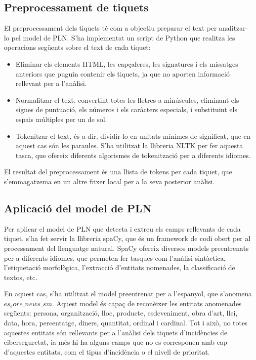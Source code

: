 \subsection{Preprocessament de tiquets}
El preprocessament dels tiquets té com a objectiu preparar el text per analitzar-lo pel model de PLN. S'ha implementat un script de Python que realitza les operacions següents sobre el text de cada tiquet:

\begin{itemize}
     \item Eliminar els elements HTML, les capçaleres, les signatures i els missatges anteriors que puguin contenir els tiquets, ja que no aporten informació rellevant per a l'anàlisi.
     \item Normalitzar el text, convertint totes les lletres a minúscules, eliminant els signes de puntuació, els números i els caràcters especials, i substituint els espais múltiples per un de sol.
     \item Tokenitzar el text, és a dir, dividir-lo en unitats mínimes de significat, que en aquest cas són les paraules. S'ha utilitzat la llibreria NLTK per fer aquesta tasca, que ofereix diferents algorismes de tokenització per a diferents idiomes.
\end{itemize}

El resultat del preprocessament és una llista de tokens per cada tiquet, que s'emmagatzema en un altre fitxer local per a la seva posterior anàlisi.

\subsection{Aplicació del model de PLN}

Per aplicar el model de PLN que detecta i extreu els camps rellevants de cada tiquet, s'ha fet servir la llibreria spaCy, que és un framework de codi obert per al processament del llenguatge natural. SpaCy ofereix diversos models preentrenats per a diferents idiomes, que permeten fer tasques com l'anàlisi sintàctica, l'etiquetació morfològica, l'extracció d'entitats nomenades, la classificació de textos, etc.

En aquest cas, s'ha utilitzat el model preentrenat per a l'espanyol, que s'anomena $es_core\_news\_sm$. Aquest model és capaç de reconèixer les entitats anomenades següents: persona, organització, lloc, producte, esdeveniment, obra d'art, llei, data, hora, percentatge, diners, quantitat, ordinal i cardinal. Tot i això, no totes aquestes entitats són rellevants per a l'anàlisi dels tiquets d'incidències de ciberseguretat, ia més hi ha alguns camps que no es corresponen amb cap d'aquestes entitats, com el tipus d'incidència o el nivell de prioritat.

